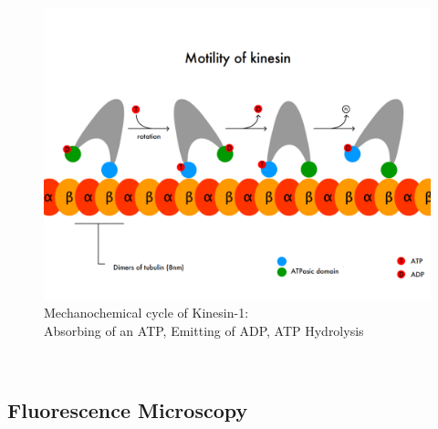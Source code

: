 		\begin{figure}[h]
				 			\centering
				 		   	\captionsetup{justification=centering}            
				 		    	  \includegraphics[scale=0.3]{pic/kinesin.png}
				 		    \caption{Mechanochemical cycle of Kinesin-1:\\ Absorbing of an ATP, Emitting of ADP, ATP Hydrolysis\cite{wikiKinesin}}
				 		   	\label{int:kinesin} 
				\end{figure}\\
	\subsection{Fluorescence Microscopy}